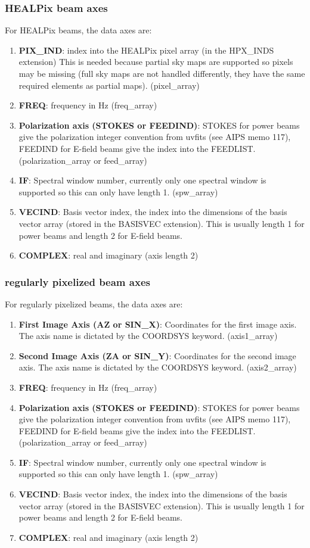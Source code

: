 \documentclass[11pt, oneside]{article}   	%
\begin{document}
\subsubsection{HEALPix beam axes}
For HEALPix beams, the data axes are: 
\begin{enumerate}
\item{\textbf{PIX\_IND}: index into the HEALPix pixel array (in the HPX\_INDS extension) This is needed because partial sky maps are supported so pixels may be missing (full sky maps are not handled differently, they have the same required elements as partial maps). (pixel\_array)}
\item{\textbf{FREQ}: frequency in Hz (freq\_array)}
\item{\textbf{Polarization axis (STOKES or FEEDIND)}: STOKES for power beams give the polarization integer convention from uvfits (see AIPS memo 117), FEEDIND for E-field beams give the index into the FEEDLIST. (polarization\_array or feed\_array)}
\item{\textbf{IF}: Spectral window number, currently only one spectral window is supported so this can only have length 1. (spw\_array)}
\item{\textbf{VECIND}: Basis vector index, the index into the dimensions of the basis vector array (stored in the BASISVEC extension). This is usually length 1 for power beams and length 2 for E-field beams.}
\item{\textbf{COMPLEX}: real and imaginary (axis length 2)}
\end{enumerate}

\subsubsection{regularly pixelized beam axes}
For regularly pixelized beams, the data axes are: 
\begin{enumerate}
\item{\textbf{First Image Axis (AZ or SIN\_X)}: Coordinates for the first image axis. The axis name is dictated by the COORDSYS keyword. (axis1\_array)}
\item{\textbf{Second Image Axis (ZA or SIN\_Y)}: Coordinates for the second image axis. The axis name is dictated by the COORDSYS keyword. (axis2\_array)}
\item{\textbf{FREQ}: frequency in Hz (freq\_array)}
\item{\textbf{Polarization axis (STOKES or FEEDIND)}: STOKES for power beams give the polarization integer convention from uvfits (see AIPS memo 117), FEEDIND for E-field beams give the index into the FEEDLIST. (polarization\_array or feed\_array)}
\item{\textbf{IF}: Spectral window number, currently only one spectral window is supported so this can only have length 1. (spw\_array)}
\item{\textbf{VECIND}: Basis vector index, the index into the dimensions of the basis vector array (stored in the BASISVEC extension). This is usually length 1 for power beams and length 2 for E-field beams.}
\item{\textbf{COMPLEX}: real and imaginary (axis length 2)}
\end{enumerate}
\end{document}
